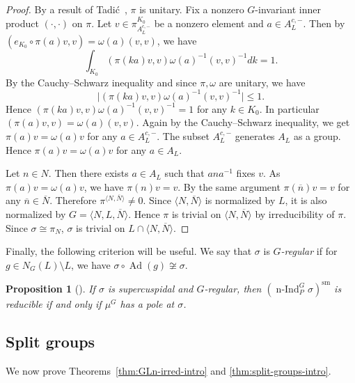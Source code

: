 \documentclass[a4paper]{amsart}
\numberwithin{equation}{section}
\newtheorem{prop}[thm]{Proposition}
\theoremstyle{remark}
\theoremstyle{definition}
\DeclareMathOperator{\nInd}{n-Ind}
\DeclareMathOperator{\Ad}{Ad}
\newcommand{\sm}{\mathrm{sm}}
\newcommand{\ang}[1]{\langle #1\rangle}
\renewcommand{\simeq}{\cong}
\begin{document}
\begin{proof}
By a result of Tadi\'c~\cite{MR976070}, $\pi$ is unitary.
Fix a nonzero $G$-invariant inner product $(\cdot,\cdot)$ on $\pi$.
Let $v\in \pi_{A_{L}^{c,-}}^{K_{0}}$ be a nonzero element and $a\in A_{L}^{c,-}$.
Then by $(e_{K_{0}}\circ\pi(a)v,v) = \omega(a)(v,v)$, we have
\[
\int_{K_{0}}(\pi(ka)v,v)\omega(a)^{-1}(v,v)^{-1}dk = 1.
\]
By the Cauchy--Schwarz inequality and since $\pi,\omega$ are unitary, we have \[\lvert (\pi(ka)v,v)\omega(a)^{-1}(v,v)^{-1}\rvert \le 1.\]
Hence $(\pi(ka)v,v)\omega(a)^{-1}(v,v)^{-1} = 1$ for any $k\in K_{0}$.
In particular $(\pi(a)v,v) = \omega(a)(v,v)$.
Again by the Cauchy--Schwarz inequality, we get $\pi(a)v = \omega(a)v$ for any $a\in A_{L}^{c,-}$.
The subset $A_{L}^{c,-}$ generates $A_{L}$ as a group.
Hence $\pi(a)v = \omega(a)v$ for any $a\in A_{L}$.

Let $n \in N$.
Then there exists $a\in A_{L}$ such that $ana^{-1}$ fixes $v$.
As $\pi(a)v = \omega(a)v$, we have $\pi(n)v = v$.
By the same argument $\pi(\overline{n})v = v$ for any $\overline{n}\in\overline{N}$.
Therefore $\pi^{\langle N,\overline{N}\rangle}\ne 0$.
Since $\langle N,\overline{N}\rangle$ is normalized by $L$, it is also normalized by $G = \ang{N,L,\overline{N}}$.
Hence $\pi$ is trivial on $\langle N,\overline{N}\rangle$ by irreducibility of $\pi$.
Since $\sigma\simeq \pi_{N}$, $\sigma$ is trivial on $L\cap \langle N,\overline{N}\rangle$.
\end{proof}

Finally, the following criterion will be useful.
We say that $\sigma$ is \emph{$G$-regular} if for $g\in N_{G}(L)\setminus L$, we have $\sigma\circ\Ad(g)\not\simeq \sigma$.
\begin{prop}[{\cite[Theorem~5.4.3.7]{MR544991}}]\label{prop:G-regular}
If $\sigma$ is supercuspidal and $G$-regular, then $(\nInd_{P}^{G}\sigma)^{\sm}$ is reducible if and only if $\mu^G$ has a pole at $\sigma$.
\end{prop}

\subsection{Split groups}
\label{sec:split-groups}

We now prove Theorems~\ref{thm:GLn-irred-intro} and \ref{thm:split-groups-intro}.
\end{document}
